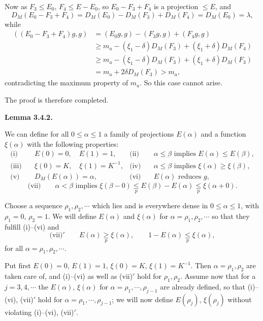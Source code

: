 \documentclass[twoside,leqno]{article}
\newcommand{\StatementTarget}[1]{\phantomsection\hypertarget{stmt:#1}{}}
\newenvironment{statement}[2]{%
  \par\medskip
  \noindent\StatementTarget{#1}\hspace*{\parindent}\textbf{#2.}\ \itshape\ignorespaces
}{\par}
\begin{document}
Now as $F_3\leq E_0$, $F_4\leq E-E_0$, so $E_0-F_3+F_4$ is a projection
$\leq E$, and
\[
 D_M(E_0-F_3+F_4)
 =D_M(E_0)-D_M(F_3)+D_M(F_4)=D_M(E_0)=\lambda,
\]
while
\begin{align*}
 ((E_0-F_3+F_4)g,g)
 &=(E_0g,g)-(F_3g,g)+(F_4g,g)\\
 &\geq m_a-(\xi_1-\delta)D_M(F_3)+(\xi_1+\delta)D_M(F_4)\\
 &\geq m_a-(\xi_1-\delta)D_M(F_3)+(\xi_1+\delta)D_M(F_3)\\
 &=m_a+2\delta D_M(F_3)>m_a,
\end{align*}
contradicting the maximum property of $m_a$. So this case cannot arise.

The proof is therefore completed.

\begin{statement}{lemma:3.4.2}{Lemma 3.4.2}
We can define for all $0\leq\alpha\leq1$ a family of projections $E(\alpha)$
and a function $\xi(\alpha)$ with the following properties:
\begin{align*}
 \text{(i)}\quad&E(0)=0,\quad E(1)=1,
 &\text{(ii)}\quad&\alpha\leq\beta\text{ implies }E(\alpha)\leq E(\beta),\\
 \text{(iii)}\quad&\xi(0)=K,\quad\xi(1)=K^{-1},
 &\text{(iv)}\quad&\alpha\leq\beta\text{ implies }\xi(\alpha)\geq\xi(\beta),\\
 \text{(v)}\quad&D_M(E(\alpha))=\alpha,
 &\text{(vi)}\quad&E(\alpha)\text{ reduces }g,
\end{align*}
\[
 \text{(vii)}\qquad
 \alpha<\beta\text{ implies }
 \xi(\beta-0)\mathrel{\underset p{\leq}}E(\beta)-E(\alpha)
 \mathrel{\underset p{\leq}}\xi(\alpha+0).
\]
\end{statement}

Choose a sequence $\rho_1,\rho_2,\cdots$ which lies and is everywhere dense
in $0\leq\alpha\leq1$, with $\rho_1=0$, $\rho_2=1$. We will define
$E(\alpha)$ and $\xi(\alpha)$ for $\alpha=\rho_1,\rho_2,\cdots$ so that
they fulfill (i)--(vi) and
\[
 \text{(vii)$'$}\qquad
 E(\alpha)\mathrel{\underset p{\geq}}\xi(\alpha),
 \qquad 1-E(\alpha)\mathrel{\underset p{\leq}}\xi(\alpha),
\]
for all $\alpha=\rho_1,\rho_2,\cdots$.

Put first $E(0)=0$, $E(1)=1$, $\xi(0)=K$, $\xi(1)=K^{-1}$. Then
$\alpha=\rho_1,\rho_2$ are taken care of, and (i)--(vi) as well as
(vii)$'$ hold for $\rho_1,\rho_2$. Assume now that for a
$j=3,4,\cdots$ the $E(\alpha)$, $\xi(\alpha)$ for
$\alpha=\rho_1,\cdots,\rho_{j-1}$ are already defined, so that (i)--(vi),
(vii)$'$ hold for $\alpha=\rho_1,\cdots,\rho_{j-1}$; we will now define
$E(\rho_j)$, $\xi(\rho_j)$ without violating (i)--(vi), (vii)$'$.
\end{document}
